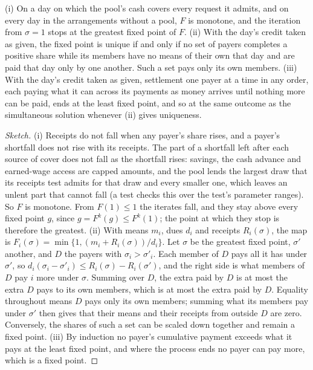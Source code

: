 \begin{proposition}[Settlement]\label{prop:settlement}
(i) On a day on which the pool's cash covers every request it admits, and on every day in the arrangements without
a pool, $F$ is monotone, and the iteration from $\sigma = 1$ stops at the greatest fixed point of $F$.
(ii) With the day's credit taken as given, the fixed point is unique if and only if no set of payers completes a
positive share while its members have no means of their own that day and are paid that day only by one another.
Such a set pays only its own members.
(iii) With the day's credit taken as given, settlement one payer at a time in any order, each paying what it can
across its payments as money arrives until nothing more can be paid, ends at the least fixed point, and so at the
same outcome as the simultaneous solution whenever (ii) gives uniqueness.
\end{proposition}

\begin{proof}[Sketch]
(i) Receipts do not fall when any payer's share rises, and a payer's shortfall does not rise with its receipts. The
part of a shortfall left after each source of cover does not fall as the shortfall rises: savings, the cash advance
and earned-wage access are capped amounts, and the pool lends the largest draw that its receipts test admits for
that draw and every smaller one, which leaves an unlent part that cannot fall (a test checks this over the test's
parameter ranges). So $F$ is monotone. From $F(1)\le 1$ the iterates fall, and they stay above every fixed point
$g$, since $g = F^{k}(g) \le F^{k}(1)$; the point at which they stop is therefore the greatest.
(ii) With means $m_{i}$, dues $d_{i}$ and receipts $R_{i}(\sigma)$, the map is $F_{i}(\sigma) = \min\{1, (m_{i} +
R_{i}(\sigma))/d_{i}\}$. Let $\sigma$ be the greatest fixed point, $\sigma'$ another, and $D$ the payers with
$\sigma_{i} > \sigma'_{i}$. Each member of $D$ pays all it has under $\sigma'$, so
$d_{i}(\sigma_{i} - \sigma'_{i}) \le R_{i}(\sigma) - R_{i}(\sigma')$, and the right side is
what members of $D$ pay $i$ more under $\sigma$. Summing over $D$, the extra paid by $D$ is at most the extra $D$ pays
to its own members, which is at most the extra paid by $D$. Equality throughout means $D$ pays only its own
members; summing what its members pay under $\sigma'$ then gives that their means and their receipts from outside $D$
are zero. Conversely, the shares of such a set can be scaled down together and remain a fixed point.
(iii) By induction no payer's cumulative payment exceeds what it pays at the least fixed point, and where the
process ends no payer can pay more, which is a fixed point.
\end{proof}

